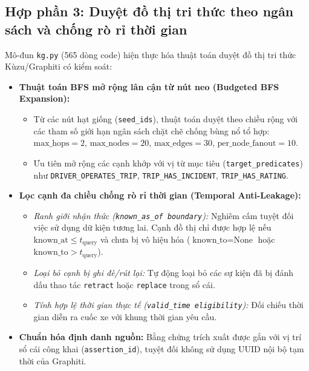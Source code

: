 \documentclass[a4paper,11pt]{article}
\begin{document}
\subsection{Hợp phần 3: Duyệt đồ thị tri thức theo ngân sách và chống rò rỉ thời gian}
\label{sec:kg-traversal}

Mô-đun \nolinkurl{kg.py} (565 dòng code) hiện thực hóa thuật toán duyệt đồ thị tri thức Kùzu/Graphiti có kiểm soát:
\begin{itemize}[leftmargin=1.5em]
    \item \textbf{Thuật toán BFS mở rộng lân cận từ nút neo (Budgeted BFS Expansion):}
    \begin{itemize}[noitemsep]
        \item Từ các nút hạt giống (\texttt{seed\_ids}), thuật toán duyệt theo chiều rộng với các tham số giới hạn ngân sách chặt chẽ chống bùng nổ tổ hợp: $\text{max\_hops} = 2$, $\text{max\_nodes} = 20$, $\text{max\_edges} = 30$, $\text{per\_node\_fanout} = 10$.
        \item Ưu tiên mở rộng các cạnh khớp với vị từ mục tiêu (\nolinkurl{target_predicates}) như \nolinkurl{DRIVER_OPERATES_TRIP}, \nolinkurl{TRIP_HAS_INCIDENT}, \nolinkurl{TRIP_HAS_RATING}.
    \end{itemize}
    \item \textbf{Lọc cạnh đa chiều chống rò rỉ thời gian (Temporal Anti-Leakage):}
    \begin{itemize}[noitemsep]
        \item \textit{Ranh giới nhận thức (\texttt{known\_as\_of boundary}):} Nghiêm cấm tuyệt đối việc sử dụng dữ kiện tương lai. Cạnh đồ thị chỉ được hợp lệ nếu $\text{known\_at} \le t_{\text{query}}$ và chưa bị vô hiệu hóa ($\text{known\_to} = \text{None}$ hoặc $\text{known\_to} > t_{\text{query}}$).
        \item \textit{Loại bỏ cạnh bị ghi đè/rút lại:} Tự động loại bỏ các sự kiện đã bị đánh dấu thao tác \texttt{retract} hoặc \texttt{replace} trong sổ cái.
        \item \textit{Tính hợp lệ thời gian thực tế (\texttt{valid\_time eligibility}):} Đối chiếu thời gian diễn ra cuốc xe với khung thời gian yêu cầu.
    \end{itemize}
    \item \textbf{Chuẩn hóa định danh nguồn:} Bằng chứng trích xuất được gắn với vị trí sổ cái công khai (\texttt{assertion\_id}), tuyệt đối không sử dụng UUID nội bộ tạm thời của Graphiti.
\end{itemize}
\end{document}
